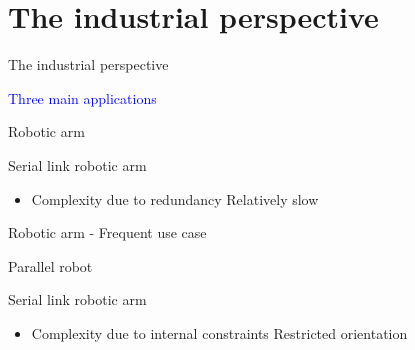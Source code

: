 \documentclass[usenames,dvipsnames,xcolor=table]{beamer}
\begin{document}


\section{The industrial perspective}
\begin{frame}{The industrial perspective}
\begin{center}
    \Large{\textcolor{blue}{Three main applications}}
    \def\svgwidth{\linewidth}
    
\end{center}
\end{frame}

\begin{frame}{Robotic arm}
    \begin{center}
        \begin{minipage}{0.49\linewidth}
                \def\svgwidth{\linewidth}
                
        \end{minipage}
        \hfill
        \begin{minipage}{0.49\linewidth}
        \large{Serial link robotic arm}
        \begin{itemize}
            \pro Large work-space
            \pro Versatility
            \item[]
            \con Complexity due to redundancy
            \con Relatively slow
        \end{itemize}
        \end{minipage}
    \end{center}
\end{frame}

\begin{frame}{Robotic arm - Frequent use case}
    \begin{center}
    \end{center}
\end{frame}
\begin{frame}{Parallel robot}
    \begin{center}
        \begin{minipage}{0.49\linewidth}
                \def\svgwidth{\linewidth}
                
        \end{minipage}
        \hfill
        \begin{minipage}{0.49\linewidth}
        \large{Serial link robotic arm}
        \begin{itemize}
            \pro Speed \& precision
            \pro Large 	work-space
            \item[]
            \con Complexity due to internal constraints
            \con Restricted orientation
        \end{itemize}
        \end{minipage}
    \end{center}
\end{frame}
\end{document}
